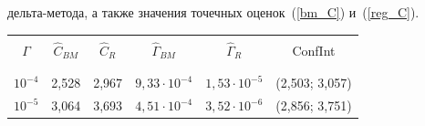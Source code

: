 дель\-та-ме\-то\-да,  а также значения точечных  оценок~(\ref{bm_C}) и~(\ref{reg_C}).





\begin{table}[b]\small %


\vspace*{-12pt}


\begin{center}




\label{t2_1}


\vspace*{2ex}








\tabcolsep=6.5pt


\begin{tabular}{|c|c|c|c|c|c|}


\hline


&&&&&\\[-9pt]


$\Gamma$ & $\hat{C}_{BM}$          & $\hat{C}_R$  & $\hat{\Gamma}_{BM}$ & 


$\hat{\Gamma}_R$ 


& ConfInt  \\ 


&&&&&\\[-9pt]


\hline


&&&&&\\[-9pt] 


 $10^{-4}$        & 2,528     & 2,967        & $9{,}33\cdot10^{-4}$ & 


 $1{,}53\cdot10^{-5}$&  (2,503; 3,057) \\ 




$10^{-5}$        & 3,064     & 3,693        & $4{,}51\cdot10^{-4}$ & 


$3{,}52\cdot10^{-6}$ & (2,856; 3,751) \\ 


\hline


 \end{tabular}


\end{center}


\end{table}








